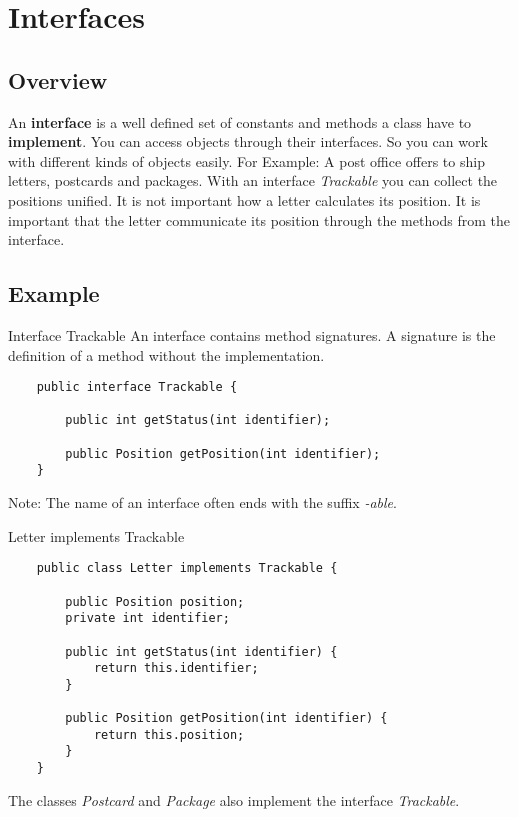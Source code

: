 
\section{Interfaces}
\subsection{Overview}
\begin{frame}{}
	An \textbf{interface} is a well defined set of constants and methods a class have to \textbf{implement}.
	\vfill
	You can access objects through their interfaces. So you can work with different kinds of objects easily.
	\vfill
	For Example: A post office offers to ship letters, postcards and packages. With an interface
	\emph{Trackable} you can collect the positions unified. 
	It is not important how a letter calculates its position.
	It is important that the letter communicate its position through the methods from the interface.
\end{frame}
\subsection{Example}
\begin{frame}[fragile]{Interface Trackable}
	An interface contains method signatures. A signature is the definition of a method without the implementation.
	\begin{lstlisting}
	public interface Trackable {
	
	    public int getStatus(int identifier);
	    
	    public Position getPosition(int identifier);
	}
	\end{lstlisting}
	Note: The name of an interface often ends with the suffix \emph{-able}.
\end{frame}
\begin{frame}[fragile]{Letter implements Trackable}
	\begin{lstlisting}
	public class Letter implements Trackable {
	
	    public Position position;
	    private int identifier;
	
	    public int getStatus(int identifier) {
	        return this.identifier;
	    }
	    
	    public Position getPosition(int identifier) {
	        return this.position;
	    }
	}
	\end{lstlisting}
	The classes \emph{Postcard} and \emph{Package} also implement the interface \emph{Trackable}.
\end{frame}

